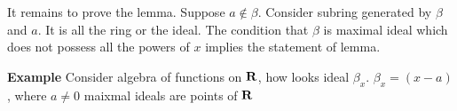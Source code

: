 It remains to prove the lemma. 
Suppose $a\not\in \beta$. Consider subring generated by $\beta$ and $a$.
It is all the ring or the ideal. The condition that $\beta$ is maximal 
ideal which does not possess all the powers of $x$ implies the 
statement of lemma.

\bigskip


{\bf Example} Consider algebra of functions on ${\bf R}$, 
how looks ideal $\beta_x$. $\beta_x=(x-a)$, where $a\not=0$
 maixmal ideals are points of ${\bf R}$









\bye








\bye

